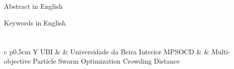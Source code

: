 \documentclass[10pt,twoside]{estiloUBI}
\begin{document}
\newpage 	
\section*{}
\vspace{0.5cm}
Abstract in English

\vspace{2.2cm}
{}
 
\vspace{0.8cm}
Keywords in English
\cleardoublepage


\tableofcontents





\listoffigures
\cleardoublepage	


\listoftables
\cleardoublepage


\newpage
\section*{}
\vspace{0.5cm}
  \begin{tabularx}{\linewidth}{c p{0.5cm} Y}
 	UBI & & Universidade da Beira Interior\cr
 	MPSOCD & & Multi-objective Particle Swarm Optimization Crowding Distance
 	\end{tabularx}
 \cleardoublepage
  

 
\mainmatter











\cleardoublepage
{}
{}
%
%
%


\appendix
 
\end{document}

